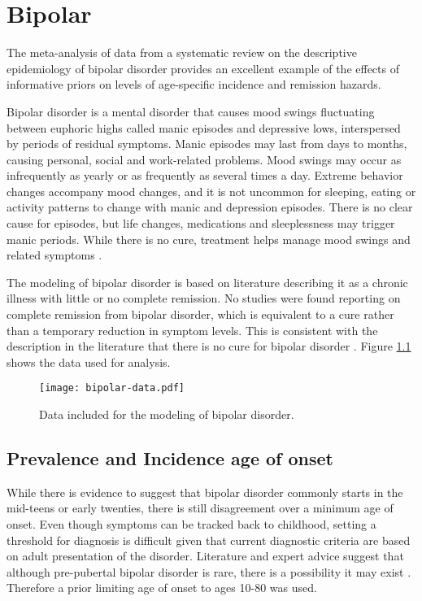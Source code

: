 \chapter{Bipolar}
\label{applications-prior_level_vals}

The meta-analysis of data from a systematic review on the descriptive epidemiology of bipolar disorder provides an excellent example of the effects of informative priors on levels of age-specific incidence and remission hazards.

Bipolar disorder is a mental disorder that causes mood swings fluctuating between euphoric highs called manic episodes and depressive lows, interspersed by periods of residual symptoms.  Manic episodes may last from days to months, causing personal, social and work-related problems.  Mood swings may occur as infrequently as yearly or as frequently as several times a day.  Extreme behavior changes accompany mood changes, and it is not uncommon for sleeping, eating or activity patterns to change with manic and depression episodes.  There is no clear cause for episodes, but life changes, medications and sleeplessness may trigger manic periods.  While there is no cure, treatment helps manage mood swings and related symptoms \cite{kloos_bipolar_2011, angst_historical_2000}.

The modeling of bipolar disorder is based on literature describing it as a chronic illness with little or no complete remission.  No studies were found reporting on complete remission from bipolar disorder, which is equivalent to a cure rather than a temporary reduction in symptom levels.  This is consistent with the description in the literature that there is no cure for bipolar disorder \cite{american_diagnostic_2000}.  Figure \ref{fig:app-bipolar data} shows the data used for analysis.

    \begin{figure}[h]
        \begin{center}
            \texttt{[image: bipolar-data.pdf]}
            \caption{Data included for the modeling of bipolar disorder.}
            \label{fig:app-bipolar data}
        \end{center}
    \end{figure}

\section{Prevalence and Incidence age of onset}
While there is evidence to suggest that bipolar disorder commonly starts in the mid-teens or early twenties, there is still disagreement over a minimum age of onset. Even though symptoms can be tracked back to childhood, setting a threshold for diagnosis is difficult given that current diagnostic criteria are based on adult presentation of the disorder. Literature and expert advice suggest that although pre-pubertal bipolar disorder is rare, there is a possibility it may exist \cite{kloos_bipolar_2011, angst_historical_2000}. Therefore a prior limiting age of onset to ages 10-80 was used.

